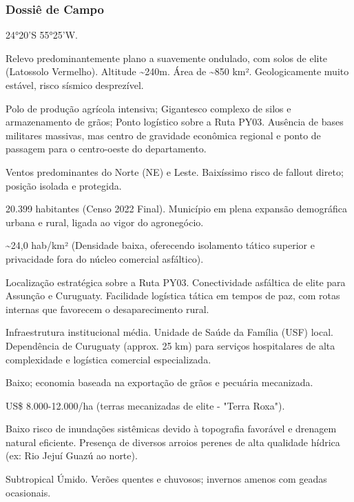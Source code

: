 \subsubsection{Dossiê de Campo}
\begin{description}[style=nextline,leftmargin=0.5cm,font=\bfseries]
\item[Coordenadas]  24°20'S 55°25'W.
\item[Topografia]  Relevo predominantemente plano a suavemente ondulado, com solos de elite (Latossolo Vermelho). Altitude \textasciitilde 240m. Área de \textasciitilde 850 km². Geologicamente muito estável, risco sísmico desprezível.
\item[Alvos Estratégicos]  Polo de produção agrícola intensiva; Gigantesco complexo de silos e armazenamento de grãos; Ponto logístico sobre a Ruta PY03. Ausência de bases militares massivas, mas centro de gravidade econômica regional e ponto de passagem para o centro-oeste do departamento.
\item[Fallout]  Ventos predominantes do Norte (NE) e Leste. Baixíssimo risco de fallout direto; posição isolada e protegida.
\item[População]  20.399 habitantes (Censo 2022 Final). Município em plena expansão demográfica urbana e rural, ligada ao vigor do agronegócio.
\item[Densidade]  \textasciitilde 24,0 hab/\allowbreak km² (Densidade baixa, oferecendo isolamento tático superior e privacidade fora do núcleo comercial asfáltico).
\item[Vias de Acesso]  Localização estratégica sobre a Ruta PY03. Conectividade asfáltica de elite para Assunção e Curuguaty. Facilidade logística tática em tempos de paz, com rotas internas que favorecem o desaparecimento rural.
\item[Serviços]  Infraestrutura institucional média. Unidade de Saúde da Família (USF) local. Dependência de Curuguaty (approx. 25 km) para serviços hospitalares de alta complexidade e logística comercial especializada.
\item[Custo de Vida]  Baixo; economia baseada na exportação de grãos e pecuária mecanizada.
\item[Preço da Terra]  US\$ 8.000-12.000/\allowbreak ha (terras mecanizadas de elite - "Terra Roxa").
\item[Hidrologia]  Baixo risco de inundações sistêmicas devido à topografia favorável e drenagem natural eficiente. Presença de diversos arroios perenes de alta qualidade hídrica (ex: Rio Jejuí Guazú ao norte).
\item[Clima]  Subtropical Úmido. Verões quentes e chuvosos; invernos amenos com geadas ocasionais.

\end{description}
